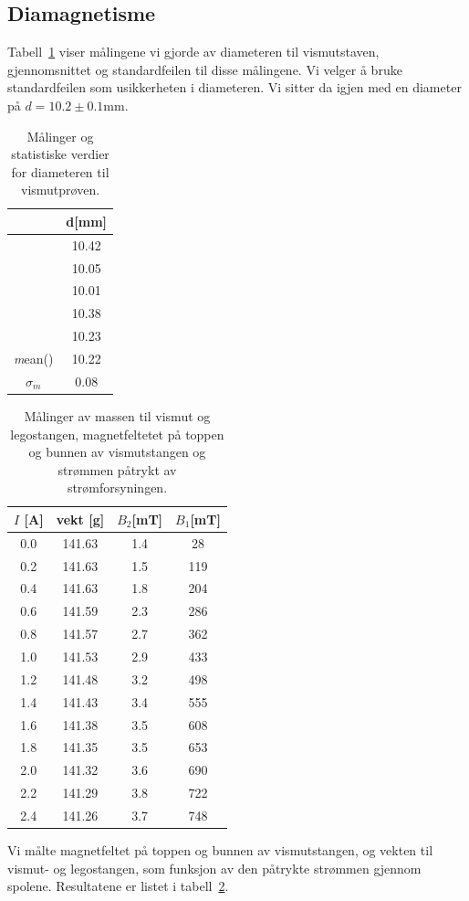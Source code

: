 \documentclass[a4paper,11pt, twocolumn]{article}
\begin{document}
\subsection{Diamagnetisme}
Tabell~\ref{tab:diameterVismut} viser målingene vi gjorde av diameteren til vismutstaven, gjennomsnittet og standardfeilen til disse målingene. Vi velger å bruke standardfeilen som usikkerheten i diameteren. Vi sitter da igjen med en diameter på $d = 10.2\pm0.1$mm.
\begin{table}[!ht]
	\centering
	\caption{Målinger og statistiske verdier for diameteren til vismutprøven.}
	\begin{tabular}{cc}
		\toprule
		\toprule
		& d[mm]\\
		\toprule
		&10.42\\ 
		&10.05\\
		&10.01\\
		&10.38\\
		&10.23\\
		\toprule
		{\textit mean()}& 10.22\\
		$\sigma_m$ & 0.08\\
		\toprule
	\end{tabular}
	\label{tab:diameterVismut}
\end{table}
\begin{table}
	\centering	
	\caption{Målinger av massen til vismut og legostangen, magnetfeltetet på toppen og bunnen av vismutstangen og strømmen påtrykt av strømforsyningen.}
	\begin{tabular}{cccc}
		\toprule
		\toprule
		$I$ [A] & vekt [g] & $B_2$[mT] & $B_1$[mT]\\
		\toprule
		0.0&	141.63&	1.4&	28 \\ 
		0.2&	141.63&	1.5&	119\\
		0.4&	141.63&	1.8&	204\\
		0.6&	141.59&	2.3&	286\\
		0.8&	141.57&	2.7&	362\\
		1.0&	141.53&	2.9&	433\\
		1.2&	141.48&	3.2&	498\\
		1.4&	141.43&	3.4&	555\\
		1.6&	141.38&	3.5&	608\\
		1.8&	141.35&	3.5&	653\\
		2.0&	141.32&	3.6&	690\\
		2.2&	141.29&	3.8&	722\\
		2.4&	141.26&	3.7&	748\\
		\toprule
	\end{tabular}
	\label{tab:measurements}
\end{table}
Vi målte magnetfeltet på toppen og bunnen av vismutstangen, og vekten til vismut- og legostangen, som funksjon av den påtrykte strømmen gjennom spolene. Resultatene er listet i tabell~\ref{tab:measurements}.
\end{document}
